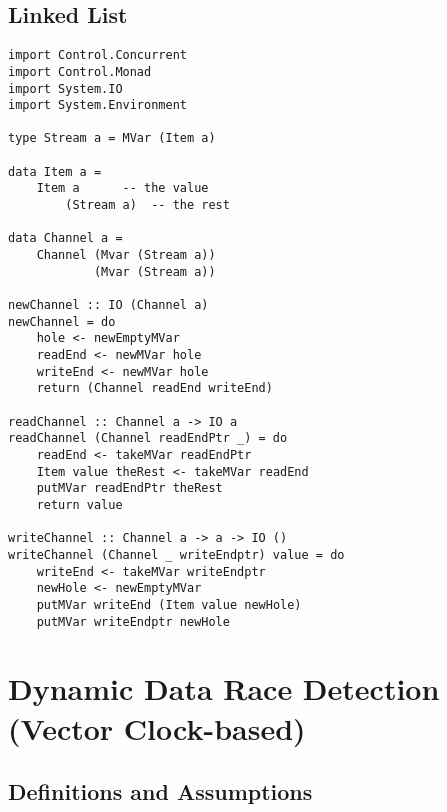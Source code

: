 \documentclass[twocolumn,landscape,10pt]{article}
\theoremstyle{definition}
\begin{document}
\subsection{Linked List}

\begin{lstlisting}[Haskell]
import Control.Concurrent
import Control.Monad
import System.IO
import System.Environment

type Stream a = MVar (Item a)

data Item a =
    Item a      -- the value
        (Stream a)  -- the rest

data Channel a =
    Channel (Mvar (Stream a))
            (Mvar (Stream a))

newChannel :: IO (Channel a)
newChannel = do
    hole <- newEmptyMVar
    readEnd <- newMVar hole
    writeEnd <- newMVar hole
    return (Channel readEnd writeEnd)

readChannel :: Channel a -> IO a
readChannel (Channel readEndPtr _) = do
    readEnd <- takeMVar readEndPtr
    Item value theRest <- takeMVar readEnd
    putMVar readEndPtr theRest
    return value

writeChannel :: Channel a -> a -> IO ()
writeChannel (Channel _ writeEndptr) value = do
    writeEnd <- takeMVar writeEndptr
    newHole <- newEmptyMVar
    putMVar writeEnd (Item value newHole)
    putMVar writeEndptr newHole
\end{lstlisting} 

\newpage
\section{Dynamic Data Race Detection (Vector Clock-based)}

\subsection{Definitions and Assumptions}
\end{document}
